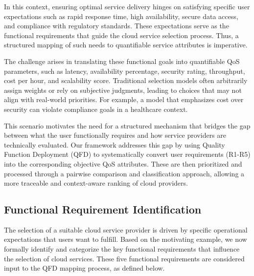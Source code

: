 \documentclass[twocolumn]{svjour3}
\begin{document}
In this context, ensuring optimal service delivery hinges on satisfying specific user expectations such as rapid response time, high availability, secure data access, and compliance with regulatory standards. These expectations serve as the functional requirements that guide the cloud service selection process. Thus, a structured mapping of such needs to quantifiable service attributes is imperative.



The challenge arises in translating these functional goals into quantifiable QoS parameters, such as latency, availability percentage, security rating, throughput, cost per hour, and scalability score. Traditional selection models often arbitrarily assign weights or rely on subjective judgments, leading to choices that may not align with real-world priorities. For example, a model that emphasizes cost over security can violate compliance goals in a healthcare context.

This scenario motivates the need for a structured mechanism that bridges the gap between what the user functionally requires and how service providers are technically evaluated. Our framework addresses this gap by using Quality Function Deployment (QFD) to systematically convert user requirements (R1-R5) into the corresponding objective QoS attributes. These are then prioritized and processed through a pairwise comparison and classification approach, allowing a more traceable and context-aware ranking of cloud providers.

\subsection{Functional Requirement Identification}

The selection of a suitable cloud service provider is driven by specific operational expectations that users want to fulfill. Based on the motivating example, we now formally identify and categorize the key functional requirements that influence the selection of cloud services. These five functional requirements are considered input to the QFD mapping process, as defined below.
\end{document}
